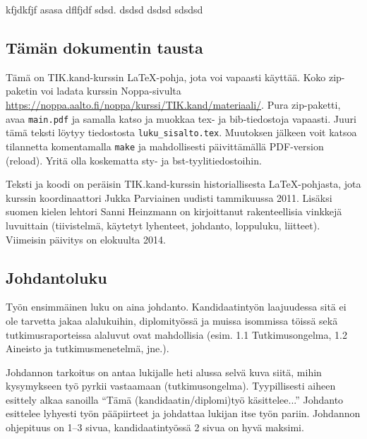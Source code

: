 kfjdkfjf \cite{dns_responsiveness} asasa dflfjdf \cite{dns_belongs_to_us} sdsd.
\cite{counting_in_the_dark} dsdsd
\cite{ipv6_discovery} dsdsd
\cite{service_discovery} sdsdsd

\subsection{Tämän dokumentin tausta}

\begin{sloppypar}
  Tämä on TIK.kand-kurssin \LaTeX{}-pohja, jota voi vapaasti
  käyttää. Koko zip-paketin voi ladata kurssin Noppa-sivulta
  \url{https://noppa.aalto.fi/noppa/kurssi/TIK.kand/materiaali/}.
  Pura zip-paketti, avaa \verb!main.pdf! ja samalla katso ja muokkaa
  tex- ja bib-tiedostoja vapaasti. Juuri tämä teksti löytyy
  tiedostosta \verb!luku_sisalto.tex!. Muutoksen jälkeen voit katsoa
  tilannetta komentamalla \verb!make! ja mahdollisesti päivittämällä
  PDF-version (reload). Yritä olla koskematta sty- ja
  bst-tyylitiedostoihin. 
\end{sloppypar}

Teksti ja koodi on peräisin TIK.kand-kurssin historiallisesta
\LaTeX{}-pohjasta, jota kurssin koordinaattori Jukka Parviainen
uudisti tammikuussa 2011.  Lisäksi suomen kielen lehtori Sanni
Heinzmann on kirjoittanut rakenteellisia vinkkejä luvuittain
(tiivistelmä, käytetyt lyhenteet, johdanto, loppuluku, liitteet).
Viimeisin päivitys on elokuulta 2014.

\subsection{Johdantoluku}

Työn ensimmäinen luku on aina johdanto. Kandidaatintyön laajuudessa
sitä ei ole tarvetta jakaa alalukuihin, diplomityössä ja muissa
isommissa töissä sekä tutkimusraporteissa alaluvut ovat mahdollisia
(esim. 1.1 Tutkimusongelma, 1.2 Aineisto ja tutkimusmenetelmä, jne.).

Johdannon tarkoitus on antaa lukijalle heti alussa selvä kuva siitä,
mihin kysymykseen työ pyrkii vastaamaan
(tutkimusongelma). Tyypillisesti aiheen esittely alkaa sanoilla ``Tämä
(kandidaatin/diplomi)työ käsittelee...''  Johdanto esittelee lyhyesti
työn pääpiirteet ja johdattaa lukijan itse työn pariin. Johdannon
ohjepituus on 1--3 sivua, kandidaatintyössä 2 sivua on hyvä maksimi.

